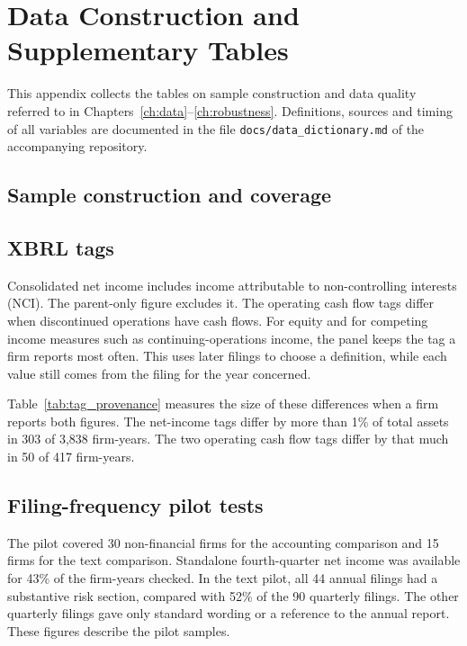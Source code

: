 \chapter{Data Construction and Supplementary Tables}
\label{app:variables}
\label{app:diagnostics}

This appendix collects the tables on sample construction and data quality
referred to in Chapters~\ref{ch:data}--\ref{ch:robustness}. Definitions,
sources and timing of all variables are documented in the file
\texttt{docs/data\_dictionary.md} of the accompanying repository.

\section{Sample construction and coverage}
\label{sec:app_sample}







\section{XBRL tags}
\label{sec:tag_provenance}

Consolidated net income includes income attributable to non-controlling interests (NCI). The parent-only figure excludes it. The operating cash flow tags differ when discontinued operations have cash flows. For equity and for competing income measures such as continuing-operations income, the panel keeps the tag a firm reports most often. This uses later filings to choose a definition, while each value still comes from the filing for the year concerned.

Table~\ref{tab:tag_provenance} measures the size of these differences when a firm reports both figures. The net-income tags differ by more than 1\% of total assets in 303 of 3{,}838 firm-years. The two operating cash flow tags differ by that much in 50 of 417 firm-years.



\section{Filing-frequency pilot tests}
\label{sec:freq_diagnostics}

The pilot covered 30 non-financial firms for the accounting comparison and 15 firms for the text comparison. Standalone fourth-quarter net income was available for 43\% of the firm-years checked. In the text pilot, all 44 annual filings had a substantive risk section, compared with 52\% of the 90 quarterly filings. The other quarterly filings gave only standard wording or a reference to the annual report. These figures describe the pilot samples.

